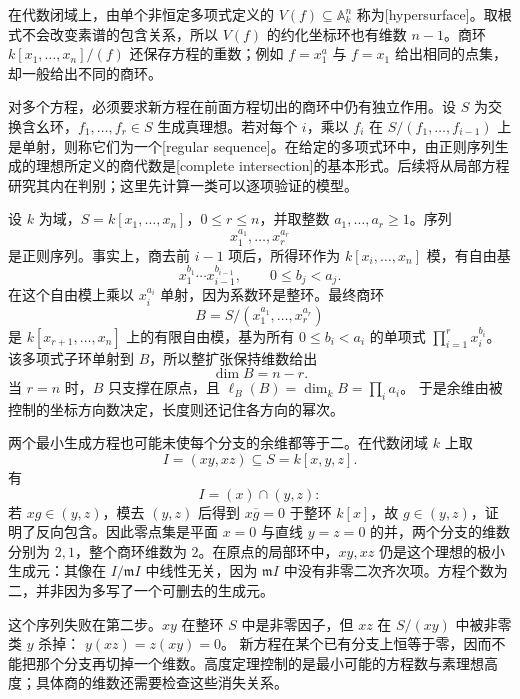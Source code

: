 在代数闭域上，由单个非恒定多项式定义的 \(V(f)\subseteq\mathbb A_k^n\) 称为[hypersurface]。取根式不会改变素谱的包含关系，所以 \(V(f)\) 的约化坐标环也有维数 \(n-1\)。商环 \(k[x_1,\ldots,x_n]/(f)\) 还保存方程的重数；例如 \(f=x_1^a\) 与 \(f=x_1\) 给出相同的点集，却一般给出不同的商环。

\ProseParagraphBreak

对多个方程，必须要求新方程在前面方程切出的商环中仍有独立作用。设 \(S\) 为交换含幺环，\(f_1,\ldots,f_r\in S\) 生成真理想。若对每个 \(i\)，乘以 \(f_i\) 在
\(S/(f_1,\ldots,f_{i-1})\)
上是单射，则称它们为一个[regular sequence]。在给定的多项式环中，由正则序列生成的理想所定义的商代数是[complete intersection]的基本形式。后续将从局部方程研究其内在判别；这里先计算一类可以逐项验证的模型。

\begin{example}
\label{g5:exm:coordinate-complete-intersection}
	设 \(k\) 为域，\(S=k[x_1,\ldots,x_n]\)，\(0\leq r\leq n\)，并取整数 \(a_1,\ldots,a_r\geq1\)。序列
	\[
		x_1^{a_1},\ldots,x_r^{a_r}
	\]
	是正则序列。事实上，商去前 \(i-1\) 项后，所得环作为 \(k[x_i,\ldots,x_n]\) 模，有自由基
	\[
		x_1^{b_1}\cdots x_{i-1}^{b_{i-1}},
		\qquad 0\leq b_j<a_j.
	\]
	在这个自由模上乘以 \(x_i^{a_i}\) 单射，因为系数环是整环。最终商环
	\[
		B=S/(x_1^{a_1},\ldots,x_r^{a_r})
	\]
	是 \(k[x_{r+1},\ldots,x_n]\) 上的有限自由模，基为所有 \(0\leq b_i<a_i\) 的单项式 \(\prod_{i=1}^r x_i^{b_i}\)。该多项式子环单射到 \(B\)，所以整扩张保持维数给出
	\[
		\dim B=n-r.
	\]
	当 \(r=n\) 时，\(B\) 只支撑在原点，且
	\(\ell_B(B)=\dim_k B=\prod_i a_i\)。
	于是余维由被控制的坐标方向数决定，长度则还记住各方向的幂次。
\end{example}

两个最小生成方程也可能未使每个分支的余维都等于二。在代数闭域 \(k\) 上取
\[
	I=(xy,xz)\subseteq S=k[x,y,z].
\]
有
\[
	I=(x)\cap(y,z):
\]
若 \(xg\in(y,z)\)，模去 \((y,z)\) 后得到 \(x\overline g=0\) 于整环 \(k[x]\)，故 \(g\in(y,z)\)，证明了反向包含。因此零点集是平面 \(x=0\) 与直线 \(y=z=0\) 的并，两个分支的维数分别为 \(2,1\)，整个商环维数为 \(2\)。在原点的局部环中，\(xy,xz\) 仍是这个理想的极小生成元：其像在 \(I/\mathfrak mI\) 中线性无关，因为 \(\mathfrak mI\) 中没有非零二次齐次项。方程个数为二，并非因为多写了一个可删去的生成元。

\ProseParagraphBreak

这个序列失败在第二步。\(xy\) 在整环 \(S\) 中是非零因子，但 \(xz\) 在 \(S/(xy)\) 中被非零类 \(y\) 杀掉：
\(y(xz)=z(xy)=0\)。
新方程在某个已有分支上恒等于零，因而不能把那个分支再切掉一个维数。高度定理控制的是最小可能的方程数与素理想高度；具体商的维数还需要检查这些消失关系。

